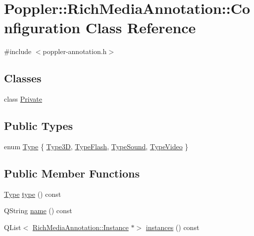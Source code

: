 \hypertarget{class_poppler_1_1_rich_media_annotation_1_1_configuration}{}\section{Poppler\+:\+:Rich\+Media\+Annotation\+:\+:Configuration Class Reference}
\label{class_poppler_1_1_rich_media_annotation_1_1_configuration}


{\ttfamily \#include $<$poppler-\/annotation.\+h$>$}

\subsection*{Classes}
\begin{DoxyCompactItemize}
\item 
class \hyperlink{class_poppler_1_1_rich_media_annotation_1_1_configuration_1_1_private}{Private}
\end{DoxyCompactItemize}
\subsection*{Public Types}
\begin{DoxyCompactItemize}
\item 
enum \hyperlink{class_poppler_1_1_rich_media_annotation_1_1_configuration_a1ea5d0aa668b750c50d3c9ae53f31e3b}{Type} \{ \hyperlink{class_poppler_1_1_rich_media_annotation_1_1_configuration_a1ea5d0aa668b750c50d3c9ae53f31e3ba0da745fe2aa4edfb2b3b70ed062e37b7}{Type3D}, 
\hyperlink{class_poppler_1_1_rich_media_annotation_1_1_configuration_a1ea5d0aa668b750c50d3c9ae53f31e3baec85b1dead02471c230b2901e3772a08}{Type\+Flash}, 
\hyperlink{class_poppler_1_1_rich_media_annotation_1_1_configuration_a1ea5d0aa668b750c50d3c9ae53f31e3bad62cc9ef3f6e0627dc115cc52591f2e9}{Type\+Sound}, 
\hyperlink{class_poppler_1_1_rich_media_annotation_1_1_configuration_a1ea5d0aa668b750c50d3c9ae53f31e3bab8198c03c1d9400573b408c5e9bd4a0c}{Type\+Video}
 \}
\end{DoxyCompactItemize}
\subsection*{Public Member Functions}
\begin{DoxyCompactItemize}
\item 
\hyperlink{class_poppler_1_1_rich_media_annotation_1_1_configuration_a1ea5d0aa668b750c50d3c9ae53f31e3b}{Type} \hyperlink{class_poppler_1_1_rich_media_annotation_1_1_configuration_a70435cb349ad43b0a286d38ab152712a}{type} () const
\item 
Q\+String \hyperlink{class_poppler_1_1_rich_media_annotation_1_1_configuration_afc69d02cfa4456428cc397280bdcc5c1}{name} () const
\item 
Q\+List$<$ \hyperlink{class_poppler_1_1_rich_media_annotation_1_1_instance}{Rich\+Media\+Annotation\+::\+Instance} $\ast$$>$ \hyperlink{class_poppler_1_1_rich_media_annotation_1_1_configuration_ae062ca0d1f67e9a5e2b19c921c72551b}{instances} () const
\end{DoxyCompactItemize}
